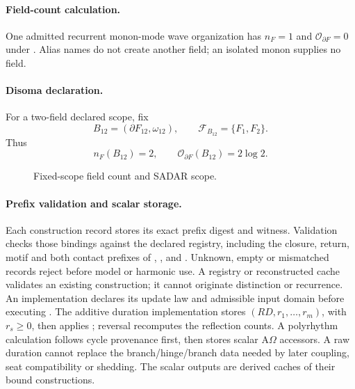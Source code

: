 \paragraph{Field-count calculation.}
One admitted recurrent monon-mode wave organization has \(n_F=1\) and
\(\mathcal O_{\partial F}=0\) under .
Alias names do not create another field; an isolated monon supplies no field.
\paragraph{Disoma declaration.}\label{subsec:disoma-declaration}
For a two-field declared scope, fix
\[
B_{12}=(\partial F_{12},\omega_{12}),
\qquad
\mathcal F_{B_{12}}=\{F_1,F_2\}.
\]
Thus
\[
n_F(B_{12})=2,
\qquad
\mathcal O_{\partial F}(B_{12})=2\log 2.
\]

\begin{figure}[H]
\centering
{}
\caption{Fixed-scope field count and SADAR scope.}
\label{fig:field-count}
\end{figure}

\paragraph{Prefix validation and scalar storage.}
Each construction record stores its exact prefix digest and witness. Validation
checks those bindings against the declared registry, including the closure,
return, motif and both contact prefixes of
,
, 
and . Unknown, empty or mismatched records
reject before model or harmonic use. A registry or reconstructed cache validates
an existing construction; it cannot originate distinction or recurrence.
An implementation declares its update law and admissible input domain before
executing . The additive duration
implementation stores \((RD,r_1,\ldots,r_m)\), with \(r_s\ge0\), then applies
; reversal recomputes the
reflection counts. A polyrhythm calculation follows cycle provenance first,
then stores scalar A\(\Omega\) accessors. A raw duration cannot replace the
branch/hinge/branch data needed by later coupling, seat compatibility or shedding.
The scalar outputs are derived caches of their bound constructions.


